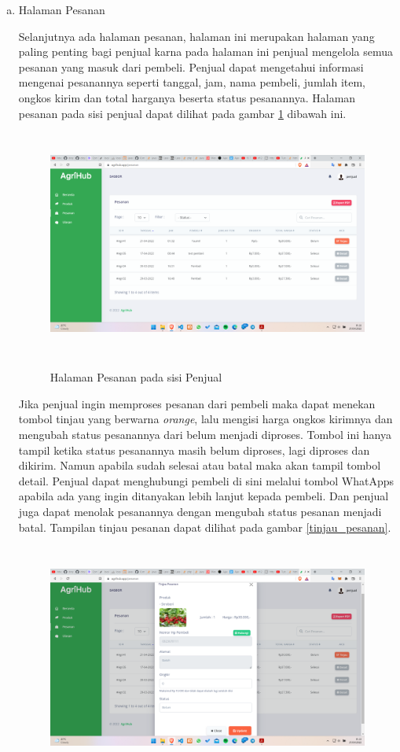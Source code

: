 \begin{enumerate}
\begin{enumerate}[a.]
		\item Halaman Pesanan
		\par Selanjutnya ada halaman pesanan, halaman ini merupakan halaman yang paling penting bagi penjual karna pada halaman ini penjual mengelola semua pesanan yang masuk dari pembeli. Penjual dapat mengetahui informasi mengenai pesanannya seperti tanggal, jam, nama pembeli, jumlah item, ongkos kirim dan total harganya beserta status pesanannya. Halaman pesanan pada sisi penjual dapat dilihat pada gambar \ref*{pesanan_penjual} dibawah ini.
		\begin{figure}[H]
			\centering
			{\includegraphics [width = 13cm, height= 7.5cm]{gambar/penjual/pesanan_penjual}}
			\caption{Halaman Pesanan pada sisi Penjual}
			\label{pesanan_penjual}
		\end{figure}
		\newpage
		\par Jika penjual ingin memproses pesanan dari pembeli maka dapat menekan tombol tinjau yang berwarna \textit{orange}, lalu mengisi harga ongkos kirimnya dan mengubah status pesanannya dari belum menjadi diproses. Tombol ini hanya tampil ketika status pesanannya masih belum diproses, lagi diproses dan dikirim. Namun apabila sudah selesai atau batal maka akan tampil tombol detail. Penjual dapat menghubungi pembeli di sini melalui tombol WhatApps apabila ada yang ingin ditanyakan lebih lanjut kepada pembeli. Dan penjual juga dapat menolak pesanannya dengan mengubah status pesanan menjadi batal. Tampilan tinjau pesanan dapat dilihat pada gambar \ref*{tinjau_pesanan}.
		\begin{figure}[H]
			\centering
			{\includegraphics [width = 13cm, height= 7.5cm]{gambar/penjual/tinjau_pesanan}}

\end{figure}
\end{enumerate}
\end{enumerate}
